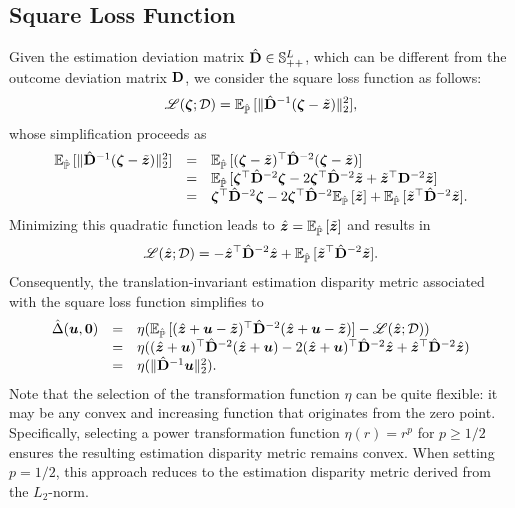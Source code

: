 \documentclass[opre, nonblindrev]{informswp}
\newcommand{\1}[1]{\mathds{1}{\left(#1\right)}}
\begin{document}
\subsection*{Square Loss Function}
Given the estimation deviation matrix ${\hat{\mathbf{D}}} \in \mathbb{S}^L_{++}$, which can be different from the outcome deviation matrix ${\mathbf{D}}$, we consider the square loss function as follows:
$$
\mathscr{L}(\bm{\zeta}; \mathcal{D}) = \mathbb{E}_{\hat{\mathbb{P}}}\,[\|{\hat{\mathbf{D}}}^{-1}(\bm{\zeta} - \tilde{\bm{z}})\|^2_2],
$$
whose simplification proceeds as
$$
\begin{array}{rcl}
\mathbb{E}_{\hat{\mathbb{P}}}\,[\|{\hat{\mathbf{D}}}^{-1}(\bm{\zeta} - \tilde{\bm{z}})\|^2_2] &=& \mathbb{E}_{\hat{\mathbb{P}}}\,[(\bm{\zeta} - \tilde{\bm{z}})^\top {\hat{\mathbf{D}}}^{-2}(\bm{\zeta} - \tilde{\bm{z}})] \\
&=& \mathbb{E}_{\hat{\mathbb{P}}}\,[\bm{\zeta}^\top {\hat{\mathbf{D}}}^{-2} \bm{\zeta} - 2 \bm{\zeta}^\top {\hat{\mathbf{D}}}^{-2} \tilde{\bm{z}} + \tilde{\bm{z}}^\top {\mathbf{D}}^{-2} \tilde{\bm{z}}] \\
&=& \bm{\zeta}^\top {\hat{\mathbf{D}}}^{-2} \bm{\zeta} - 2\bm{\zeta}^\top {\hat{\mathbf{D}}}^{-2} \mathbb{E}_{\hat{\mathbb{P}}}\,[\tilde{\bm{z}}] + \mathbb{E}_{\hat{\mathbb{P}}}\,[\tilde{\bm{z}}^\top  {\hat{\mathbf{D}}}^{-2} \tilde{\bm{z}}].
\end{array}
$$
Minimizing this quadratic function leads to $\hat{\bm{z}} = \mathbb{E}_{\hat{\mathbb{P}}}\,[\tilde{\bm{z}}]$ and results in
$$
\mathscr{L}(\hat{\bm{z}}; \mathcal{D}) = -\hat{\bm{z}}^\top {\hat{\mathbf{D}}}^{-2} \hat{\bm{z}} + \mathbb{E}_{\hat{\mathbb{P}}}\,[\tilde{\bm{z}}^\top  {\hat{\mathbf{D}}}^{-2}\tilde{\bm{z}}].
$$
Consequently, the translation-invariant estimation disparity metric associated with the square loss function simplifies to
$$
\begin{array}{rcl}
\hat \Delta(\bm u,\bm 0) &=& \eta (\mathbb{E}_{\hat{\mathbb{P}}}\,[(\hat{\bm{z}} + \bm u - \tilde{\bm{z}})^\top {\hat{\mathbf{D}}}^{-2}(\hat{\bm{z}} + \bm u- \tilde{\bm{z}})] - \mathscr{L}(\hat{\bm{z}}; \mathcal{D})) \\
&=& \eta ((\hat{\bm{z}} + \bm{u})^\top {\hat{\mathbf{D}}}^{-2} (\hat{\bm{z}} + \bm u) - 2(\hat{\bm{z}} + \bm{u})^\top {\hat{\mathbf{D}}}^{-2} \hat{\bm{z}} + \hat{\bm{z}}^\top {\hat{\mathbf{D}}}^{-2} \hat{\bm{z}}) \\
&=& \eta(\|{\hat{\mathbf{D}}}^{-1} \bm u\|^2_2). 
\end{array}
$$
Note that the selection of the transformation function $\eta$ can be quite flexible: it may be any convex and increasing function that originates from the zero point. Specifically, selecting a power transformation function $\eta(r) = r^p$ for $p \geq 1/2$ ensures the resulting estimation disparity metric remains convex. When setting $p = 1/2$, this approach reduces to the estimation disparity metric derived from the $L_2$-norm. 
\end{document}

